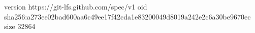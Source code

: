 version https://git-lfs.github.com/spec/v1
oid sha256:a273ee02bad600aa6c49ee17f42cda1e83200049d8019a242e2c6a30be9670ec
size 32864
